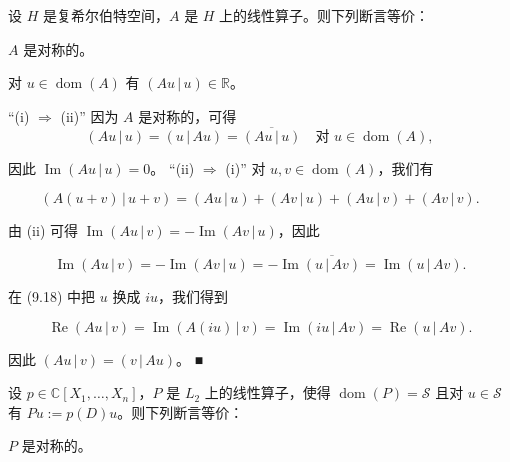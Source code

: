 \begin{remark}

\begin{items}
\item

设 $ H $ 是复希尔伯特空间，$ A $ 是 $ H $ 上的线性算子。则下列断言等价：

\begin{subitems}
\item

$ A $ 是对称的。

\item

对 $ u \in \operatorname{dom}(A) $ 有 $ (Au\,|\,u) \in \mathbb{R} $。

\proofhead
“(i) $ \Rightarrow $ (ii)” 因为 $ A $ 是对称的，可得
\[
(Au\,|\,u) = (u\,|\,Au) = \overline{(Au\,|\,u)} \quad \text{对 } u \in \operatorname{dom}(A) ,
\]

因此 $ \operatorname{Im}(Au\,|\,u) = 0 $。
“(ii) $ \Rightarrow $ (i)” 对 $ u, v \in \operatorname{dom}(A) $，我们有

\begin{equation}
(A(u+v)\,|\,u+v) = (Au\,|\,u) + (Av\,|\,u) + (Au\,|\,v) + (Av\,|\,v) .\tag{9.18}
\end{equation}

由 (ii) 可得 $ \operatorname{Im}(Au\,|\,v) = -\operatorname{Im}(Av\,|\,u) $，因此

\[
\operatorname{Im}(Au\,|\,v) = -\operatorname{Im}(Av\,|\,u) = -\operatorname{Im}\overline{(u\,|\,Av)} = \operatorname{Im}(u\,|\,Av) .
\]

在 (9.18) 中把 $ u $ 换成 $ iu $，我们得到

\[
\operatorname{Re}(Au\,|\,v) = \operatorname{Im}(A(iu)\,|\,v) = \operatorname{Im}(iu\,|\,Av) = \operatorname{Re}(u\,|\,Av) .
\]

因此 $ (Au\,|\,v) = (v\,|\,Au) $。 \nobreak\hspace{0.35em}■

\end{subitems}

\item

设 $ p \in \mathbb{C}[X_1,\ldots,X_n] $，$ P $ 是 $ L_2 $ 上的线性算子，使得 $ \operatorname{dom}(P) = \mathcal{S} $ 且对 $ u \in \mathcal{S} $ 有 $ Pu := p(D)u $。则下列断言等价：

\begin{subitems}
\item

$ P $ 是对称的。


\end{subitems}
\end{items}
\end{remark}

